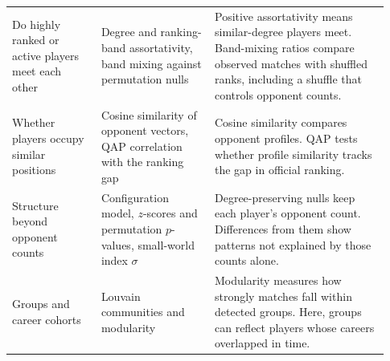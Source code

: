 \begin{tabular}{@{}>{\raggedright\arraybackslash}p{0.22\linewidth}>{\raggedright\arraybackslash}p{0.28\linewidth}>{\raggedright\arraybackslash}p{0.43\linewidth}@{}}
\addlinespace[3pt]
Do highly ranked or active players meet each other & Degree and ranking-band assortativity, band mixing against permutation nulls & Positive assortativity means similar-degree players meet. Band-mixing ratios compare observed matches with shuffled ranks, including a shuffle that controls opponent counts. \\
\addlinespace[3pt]
Whether players occupy similar positions & Cosine similarity of opponent vectors, QAP correlation with the ranking gap & Cosine similarity compares opponent profiles. QAP tests whether profile similarity tracks the gap in official ranking. \\
\addlinespace[3pt]
Structure beyond opponent counts & Configuration model, $z$-scores and permutation $p$-values, small-world index $\sigma$ & Degree-preserving nulls keep each player's opponent count. Differences from them show patterns not explained by those counts alone. \\
\addlinespace[3pt]
Groups and career cohorts & Louvain communities and modularity & Modularity measures how strongly matches fall within detected groups. Here, groups can reflect players whose careers overlapped in time. \\
\bottomrule
\end{tabular}
